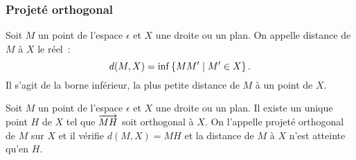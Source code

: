 \subsubsection{Projeté orthogonal}
\begin{defdef}
  Soit \(M\) un point de l'espace \(\epsilon\) et \(X\) une droite ou un plan. On appelle distance de \(M\) à \(X\) le réel~:
  \begin{equation}
    d(M,X)=\operatorname{inf}\left\{MM'\mathrel{}\middle|\mathrel{}M' \in X\right\}.
  \end{equation}
Il s'agit de la borne inférieur, la plus petite distance de \(M\) à un point de \(X\).
\end{defdef}
%
\begin{prop}
  Soit \(M\) un point de l'espace \(\epsilon\) et \(X\) une droite ou un plan. Il existe un unique point \(H\) de \(X\) tel que \(\overrightarrow{MH}\) soit orthogonal à \(X\). On l'appelle projeté orthogonal de \(M\) sur \(X\) et il vérifie \(d(M,X)=MH\) et la distance de \(M\) à \(X\) n'est atteinte qu'en \(H\).
\end{prop}
